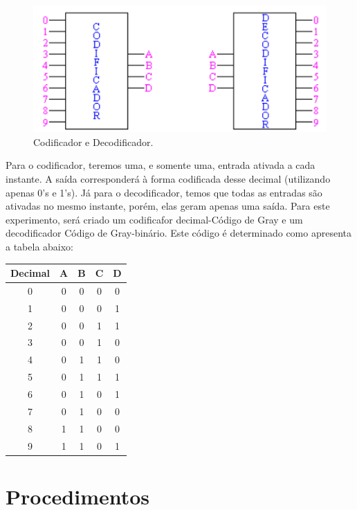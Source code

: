\documentclass[12pt]{article}
\begin{document}
\begin{figure}[H]
	\centering
	\includegraphics[width=.5\textwidth]{coddecod.jpg}
	\caption{Codificador e Decodificador.}
	\label{fig:coddecod}
\end{figure}


Para o codificador, teremos uma, e somente uma, entrada ativada a cada instante. A saída corresponderá à forma codificada desse decimal (utilizando apenas 0’s e 1’s). Já para o decodificador, temos que todas as entradas são ativadas no mesmo instante, porém, elas geram apenas uma saída. 
Para este experimento, será criado um codificafor decimal-Código de Gray e um decodificador Código de Gray-binário. Este código é determinado como apresenta a tabela abaixo:

\begin{table}[H]
	\centering
	\begin{tabular}{|c|c|c|c|c|}
		\cline{1-5}
		\multicolumn{1}{|c|}{Decimal} & \multicolumn{1}{|c|}{A} & \multicolumn{1}{|c|}{B} & \multicolumn{1}{|c|}{C} & \multicolumn{1}{|c|}{D}\\
		\hline
		0 & 0 & 0 & 0 & 0 \\
		\hline
		1 & 0 & 0 & 0 & 1 \\
		\hline
		2 & 0 & 0 & 1 & 1 \\
		\hline
		3 & 0 & 0 & 1 & 0 \\
		\hline
		4 & 0 & 1 & 1 & 0 \\
		\hline
		5 & 0 & 1 & 1 & 1 \\
		\hline
		6 & 0 & 1 & 0 & 1 \\
		\hline
		7 & 0 & 1 & 0 & 0 \\
		\hline
		8 & 1 & 1 & 0 & 0 \\
		\hline
		9 & 1 & 1 & 0 & 1 \\
		\hline
	\end{tabular}
	
\end{table} 




\section{Procedimentos}
\label{sec:Procedimentos}
\end{document}
